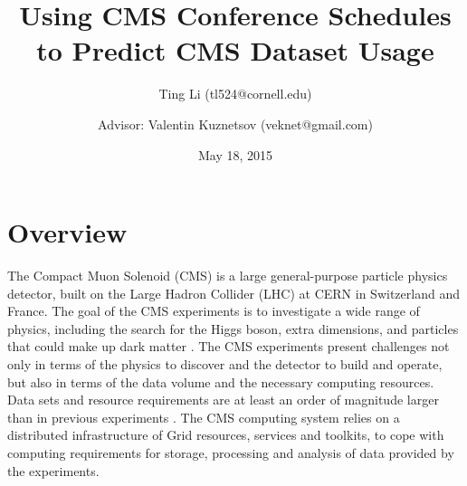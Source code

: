 \documentclass[preprint, 12pt]{elsarticle}
\begin{document}
\begin{frontmatter}


  \title{Using CMS Conference Schedules to Predict CMS Dataset Usage}

  \date{May 18, 2015}



  \author[cs]{Ting Li (tl524@cornell.edu)}
  \author[phy]{Advisor: Valentin Kuznetsov (veknet@gmail.com)}

  \address[cs]{Computer Science Department, Cornell University}
  \address[phy]{Physics Department, Cornell University}
   

  


\end{frontmatter}

\section{Overview}
\label{S:1}


The Compact Muon Solenoid (CMS) is a large general-purpose particle physics detector, built on the Large Hadron Collider (LHC) at CERN in Switzerland and France. The goal of the CMS experiments is to investigate a wide range of physics, including the search for the Higgs boson, extra dimensions, and particles that could make up dark matter \cite{web:wiki}.
The CMS experiments present challenges not only in terms of the physics to discover and the detector to build and operate, but also in terms of the data volume and the necessary computing resources. Data sets and resource requirements are at least an order of magnitude larger than in previous experiments \cite{web:cms}.
The CMS computing system relies on a distributed infrastructure of Grid resources, services and toolkits, to cope with computing requirements for storage, processing and analysis of data provided by the experiments. 
\end{document}
